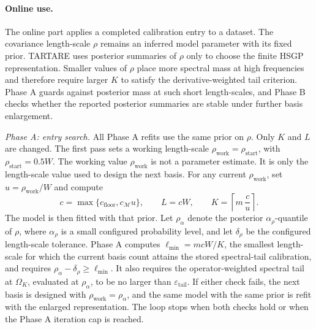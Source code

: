\documentclass[11pt,a4paper]{article}
\theoremstyle{definition}
\theoremstyle{remark}
\begin{document}
\paragraph{Online use.}
The online part applies a completed calibration entry to a dataset. The covariance length-scale \(\rho\) remains an inferred model parameter with its fixed prior. TARTARE uses posterior summaries of \(\rho\) only to choose the finite HSGP representation. Smaller values of \(\rho\) place more spectral mass at high frequencies and therefore require larger \(K\) to satisfy the derivative-weighted tail criterion. Phase A guards against posterior mass at such short length-scales, and Phase B checks whether the reported posterior summaries are stable under further basis enlargement.

\emph{Phase A: entry search.} All Phase A refits use the same prior on \(\rho\). Only \(K\) and \(L\) are changed. The first pass sets a working length-scale \(\rho_{\mathrm{work}}=\rho_{\mathrm{start}}\), with \(\rho_{\mathrm{start}}=0.5W\). The working value \(\rho_{\mathrm{work}}\) is not a parameter estimate. It is only the length-scale value used to design the next basis. For any current \(\rho_{\mathrm{work}}\), set \(u=\rho_{\mathrm{work}}/W\) and compute
\[
c=\max\{c_{\mathrm{floor}},c_{\mathcal M}u\},
\qquad
L=cW,
\qquad
K=\left\lceil m\,\frac{c}{u}\right\rceil .
\]
The model is then fitted with that prior. Let \(\rho_{\alpha}\) denote the posterior \(\alpha_\rho\)-quantile of \(\rho\), where \(\alpha_\rho\) is a small configured probability level, and let \(\delta_\rho\) be the configured length-scale tolerance. Phase A computes \(\ell_{\min}=mcW/K\), the smallest length-scale for which the current basis count attains the stored spectral-tail calibration, and requires \(\rho_{\alpha}-\delta_\rho\geq\ell_{\min}\). It also requires the operator-weighted spectral tail at \(\Omega_K\), evaluated at \(\rho_{\alpha}\), to be no larger than \(\varepsilon_{\mathrm{tail}}\). If either check fails, the next basis is designed with \(\rho_{\mathrm{work}}=\rho_{\alpha}\), and the same model with the same prior is refit with the enlarged representation. The loop stops when both checks hold or when the Phase A iteration cap is reached.
\end{document}
